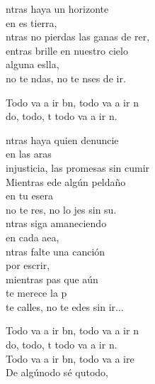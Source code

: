 \begin{cancion}%
	ntras haya un horizonte \\
	en es tierra,\\
	ntras no pierdas las ganas de rer,\\
	entras brille en nuestro cielo\\
	alguna eslla,\\
	no te ndas, no te nses de ir.\\
	\begin{chorus}%
	Todo va a ir bn, todo va a ir n\\
	do, todo, t todo va a ir n.\\
	\end{chorus}%
	ntras haya quien denuncie \\
	en las aras\\
	injusticia, las promesas sin cumir\\
	Mientras ede algún peldaño \\
	en tu esera\\
	no te res, no lo jes sin su.\\
	ntras siga amaneciendo\\
	en cada aea,\\
	ntras falte una canción\\
	por escrir,\\
	mientras pas que aún\\
	te merece la p\\
	 te calles, no te edes sin ir...\\
	\begin{chorus}%
	Todo va a ir bn, todo va a ir n\\
	do, todo, t todo va a ir n.\\
	Todo va a ir bn, todo va a ire\\
	De algúnodo sé qutodo,\\

\end{chorus}
\end{cancion}
